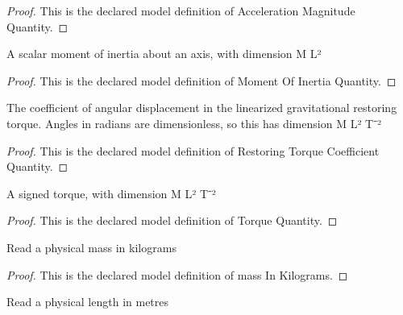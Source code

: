 \begin{proof}
  This is the declared model definition of Acceleration Magnitude Quantity.
\end{proof}
\begin{definition}
  \label{def:physics:phyx-mini-0263:phyxminiproblems-problemphyxmini0263-momentofinertiaquantity}
  A scalar moment of inertia about an axis, with dimension M L²
\end{definition}
\begin{proof}
  This is the declared model definition of Moment Of Inertia Quantity.
\end{proof}
\begin{definition}
  \label{def:physics:phyx-mini-0263:phyxminiproblems-problemphyxmini0263-restoringtorquecoefficientquantity}
  The coefficient of angular displacement in the linearized gravitational restoring torque. Angles in radians are dimensionless, so this has dimension M L² T⁻²
\end{definition}
\begin{proof}
  This is the declared model definition of Restoring Torque Coefficient Quantity.
\end{proof}
\begin{definition}
  \label{def:physics:phyx-mini-0263:phyxminiproblems-problemphyxmini0263-torquequantity}
  A signed torque, with dimension M L² T⁻²
\end{definition}
\begin{proof}
  This is the declared model definition of Torque Quantity.
\end{proof}
\begin{definition}
  \label{def:physics:phyx-mini-0263:phyxminiproblems-problemphyxmini0263-massinkilograms}
  Read a physical mass in kilograms
\end{definition}
\begin{proof}
  This is the declared model definition of mass In Kilograms.
\end{proof}
\begin{definition}
  \label{def:physics:phyx-mini-0263:phyxminiproblems-problemphyxmini0263-lengthinmeters}
  Read a physical length in metres
\end{definition}
